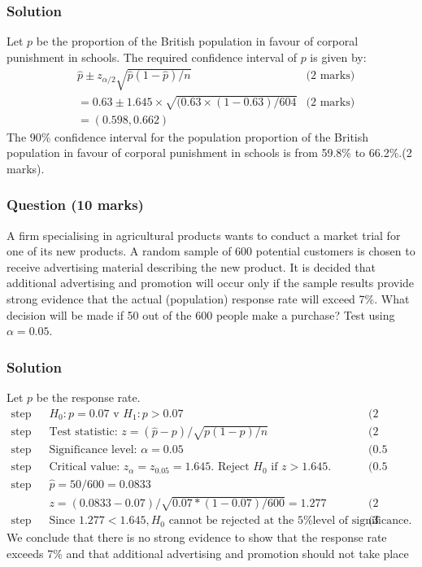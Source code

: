 \documentclass[a4paper,oneside]{book}
\begin{document}
\subsubsection*{Solution}
Let $p$ be the proportion of the British population in favour of corporal punishment in
schools. The required confidence interval of $p$ is given by:
\begin{align*}
  & \hat{p} \pm z_{\alpha/2}\sqrt{\hat{p}(1-\hat{p})/n}  & \text{(2 marks)}\\
  & = 0.63\pm 1.645\times \sqrt{(0.63\times (1-0.63)/604}  & \text{(2 marks)}\\
  & = (0.598,0.662)
\end{align*}
The 90\% confidence interval for the population proportion of the British population in favour of
corporal punishment in schools is from 59.8\% to 66.2\%.\quad (2 marks).

\subsubsection*{Question (10 marks)}
A firm specialising in agricultural products wants to conduct a market
trial for one of its new products. A random sample of 600 potential
customers is chosen to receive advertising material describing the new
product. It is decided that additional advertising and promotion will
occur only if the sample results provide strong evidence that the
actual (population) response rate will exceed
7\%. What decision will be made if 50 out of the 600 people make a purchase? Test using $\alpha = 0.05$.

\subsubsection*{Solution}
Let $p$ be the response rate.
\begin{align*}
  \text{step 1. } &  H_0 : p = 0.07 \text{ v } H_1 : p > 0.07 & \text{(2
    marks)} \\
  \text{step 2. } & \text{Test statistic: } z = (\hat{p} - p)/\sqrt{p(1
    - p)/n} & \text{(2 marks)} \\
  \text{step 3. } & \text{Significance level: } \alpha = 0.05 &
  \text{(0.5 marks)} \\
  \text{step 4. } & \text{Critical value: } z_{\alpha} = z_{0.05} =
  1.645. \text{ Reject } H_0 \text{ if } z > 1.645. & \text{(0.5
    marks)} \\
  \text{step 5. } & \hat{p} = 50/600 = 0.0833 &  \\
                 & z = (0.0833 - 0.07)/\sqrt{0.07*(1-0.07)/600} =
                 1.277 & \text{(2 marks)} \\ 
  \text{step 6. } & \text{Since } 1.277 < 1.645, H_0 \text{ cannot be
    rejected at the 5\% level of significance}. & \text{(3 marks)}
\end{align*}
We conclude that there is no strong evidence to show that the response
rate exceeds 7\% and that additional advertising and promotion should
not take place
\end{document}

